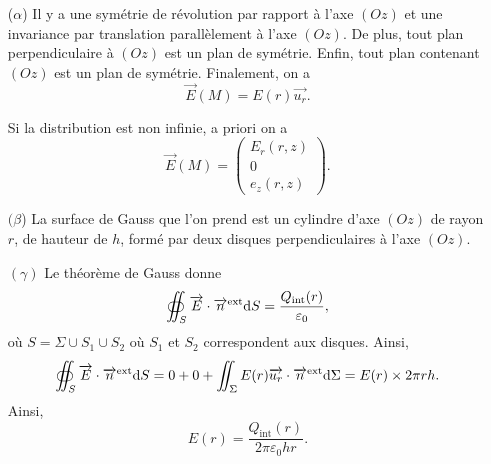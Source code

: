             \begin{itemize}
                \item [($\alpha$)] Il y a une symétrie de révolution par rapport à l'axe $(Oz)$ et une invariance par translation parallèlement à l'axe $(Oz)$. De plus, tout plan perpendiculaire à $(Oz)$ est un plan de symétrie. Enfin, tout plan contenant $(Oz)$ est un plan de symétrie. Finalement, on a 
                \begin{equation}
                    \boxed{
                    \vec{E}(M)=E(r)\vec{u_r}.
                    }
                \end{equation}
                \begin{remark}
                    Si la distribution est non infinie, a priori on a 
                    \begin{equation}
                        \vec{E}(M)=\begin{pmatrix}
                            E_r(r,z)\\0\\e_z(r,z)
                        \end{pmatrix}.
                    \end{equation}
                \end{remark}

                \item [$(\beta$)] La surface de Gauss que l'on prend est un cylindre d'axe $(Oz)$ de rayon $r$, de hauteur de $h$, formé par deux disques perpendiculaires à l'axe $(Oz)$.
                
                \item [$(\gamma)$] Le théorème de Gauss donne
                \begin{equation}
                    \oiint_{S}\protect\overrightarrow{{E}}\cdot\protect\overrightarrow{{n}}^{\text{ext}}\mathrm{d} S=\frac{Q_{\text{int}}(r)}{\varepsilon_{0}},
                \end{equation}
                où $S=\Sigma\cup S_1\cup S_2$ où $S_1$ et $S_2$ correspondent aux disques. Ainsi, 
                \begin{equation}
                    \oiint_{S}\protect\overrightarrow{{E}}\cdot\protect\overrightarrow{{n}}^{\text{ext}}\mathrm{d} S=0+0+\iint_{\Sigma}E(r)\protect\overrightarrow{{u_r}}\cdot\protect\overrightarrow{{n}}^{\text{ext}}\mathrm{d} \Sigma=E(r)\times 2\pi r h.
                \end{equation}
                Ainsi,
                \begin{equation}
                    \boxed{
                        E(r)=\frac{Q_{\text{int}}(r)}{2\pi\varepsilon_{0}hr}.
                    }
                \end{equation}

            \end{itemize}

